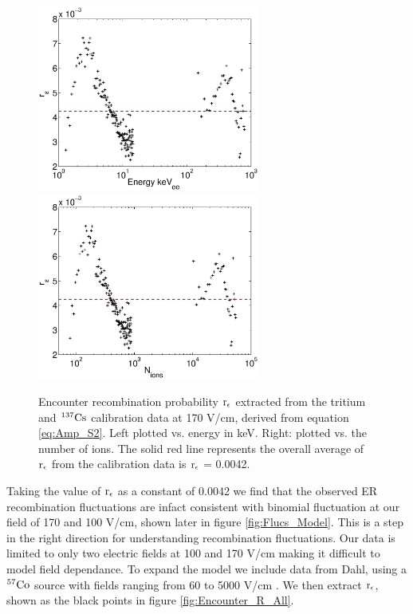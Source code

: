 \renewcommand{\baselinestretch}{1}
\small\normalsize
\begin{figure}[h!]\centering
\includegraphics[width=73mm]{Chapter_Flucs/Figures/Recomb_Flucs/E_const.eps}
\includegraphics[width=73mm]{Chapter_Flucs/Figures/Recomb_Flucs/Ni_const.eps}
\caption{ Encounter recombination probability $\rm r_\epsilon$ extracted from the tritium and $\rm^{137}Cs$ calibration data at 170 V/cm, derived from equation \ref{eq:Amp_S2}. Left plotted vs. energy in keV. Right: plotted vs. the number of ions. The solid red line represents the overall average of $\rm r_\epsilon$ from the calibration data is $\rm r_\epsilon$ = 0.0042. }
\label{fig:Encounter_R_Const}
\end{figure}
\renewcommand{\baselinestretch}{2}
\small\normalsize

\newpage

Taking the value of $\rm r_\epsilon$ as a constant of 0.0042 we find that the observed ER recombination fluctuations are infact consistent with binomial fluctuation at our field of 170 and 100 V/cm, shown later in figure \ref{fig:Flucs_Model}. This is a step in the right direction for understanding recombination fluctuations. Our data is limited to only two electric fields at 100 and 170 V/cm making it difficult to model field dependance. To expand the model we include data from Dahl, using a $\rm ^{57}Co$ source with fields ranging from 60 to 5000 V/cm \cite{Dahl_Thesis}. We then extract $\rm r_\epsilon$, shown as the black points in figure \ref{fig:Encounter_R_All}.

